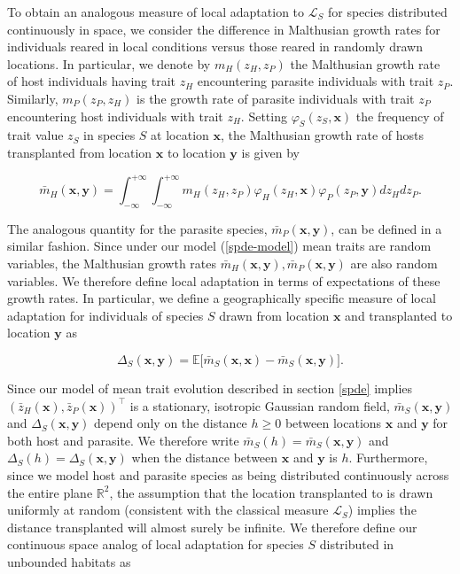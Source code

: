 \documentclass{article}
\begin{document}
To obtain an analogous measure of local adaptation to \(\mathcal L_S\)
for species distributed continuously in space, we consider the
difference in Malthusian growth rates for individuals reared in local
conditions versus those reared in randomly drawn locations. In
particular, we denote by \(m_H(z_H,z_P)\) the Malthusian growth rate of
host individuals having trait \(z_H\) encountering parasite individuals
with trait \(z_P\). Similarly, \(m_P(z_P,z_H)\) is the growth rate of
parasite individuals with trait \(z_P\) encountering host individuals
with trait \(z_H\). Setting \(\varphi_S(z_S,\pmb x)\) the frequency of
trait value \(z_S\) in species \(S\) at location \(\pmb x\), the
Malthusian growth rate of hosts transplanted from location \(\pmb x\) to
location \(\pmb y\) is given by

\begin{equation}
  \bar m_H(\pmb x,\pmb y)=\int_{-\infty}^{+\infty}\int_{-\infty}^{+\infty}m_H(z_H,z_P)\varphi_H(z_H,\pmb x)\varphi_P(z_P,\pmb y)dz_Hdz_P.
\end{equation}

The analogous quantity for the parasite species,
\(\bar m_P(\pmb x,\pmb y)\), can be defined in a similar fashion. Since
under our model (\ref{spde-model}) mean traits are random variables, the
Malthusian growth rates
\(\bar m_H(\pmb x,\pmb y),\bar m_P(\pmb x,\pmb y)\) are also random
variables. We therefore define local adaptation in terms of expectations
of these growth rates. In particular, we define a geographically
specific measure of local adaptation for individuals of species \(S\)
drawn from location \(\pmb x\) and transplanted to location \(\pmb y\)
as

\begin{equation}
  \Delta_S(\pmb x,\pmb y)=\mathbb E\big[\bar m_S(\pmb x,\pmb x)-\bar m_S(\pmb x,\pmb y)\big].
\end{equation}

Since our model of mean trait evolution described in section \ref{spde}
implies \((\bar z_H(\pmb x),\bar z_P(\pmb x))^\top\) is a stationary,
isotropic Gaussian random field, \(\bar m_S(\pmb x,\pmb y)\) and
\(\Delta_S(\pmb x,\pmb y)\) depend only on the distance \(h\geq0\)
between locations \(\pmb x\) and \(\pmb y\) for both host and parasite.
We therefore write \(\bar m_S(h)=\bar m_S(\pmb x,\pmb y)\) and
\(\Delta_S(h)=\Delta_S(\pmb x,\pmb y)\) when the distance between
\(\pmb x\) and \(\pmb y\) is \(h\). Furthermore, since we model host and
parasite species as being distributed continuously across the entire
plane \(\mathbb R^2\), the assumption that the location transplanted to
is drawn uniformly at random (consistent with the classical measure
\(\mathcal L_S\)) implies the distance transplanted will almost surely
be infinite. We therefore define our continuous space analog of local
adaptation for species \(S\) distributed in unbounded habitats as
\end{document}
